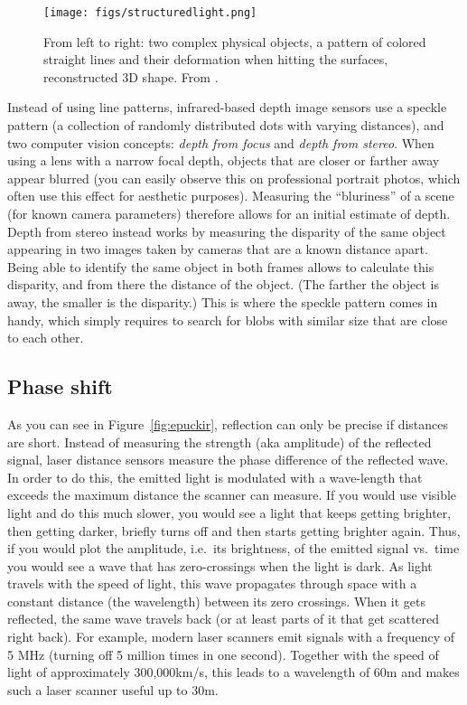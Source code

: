\begin{figure}
	\centering
		\texttt{[image: figs/structuredlight.png]}
	\caption{From left to right: two complex physical objects, a pattern of colored straight lines and their deformation when hitting the surfaces, reconstructed 3D shape. From \protect\cite{zhang2002rapid}.}
	\label{fig:struclight}
\end{figure}

Instead of using line patterns, infrared-based depth image sensors use a speckle pattern (a collection of randomly distributed dots with varying distances), and two computer vision concepts: \emph{depth from focus} and \emph{depth from stereo}. When using a lens with a narrow focal depth, objects that are closer or farther away appear blurred (you can easily observe this on professional portrait photos, which often use this effect for aesthetic purposes). Measuring the ``bluriness'' of a scene (for known camera parameters) therefore allows for an initial estimate of depth. Depth from stereo instead works by measuring the disparity of the same object appearing in two images taken by cameras that are a known distance apart. Being able to identify the same object in both frames allows to calculate this disparity, and from there the distance of the object. (The farther the object is away, the smaller is the disparity.) This is where the speckle pattern comes in handy, which simply requires to search for blobs with similar size that are close to each other.


\subsection{Phase shift}\label{sec:phaseshiftsensors}
As you can see in Figure~\ref{fig:epuckir}, reflection can only be precise if distances are short. Instead of measuring the strength (aka amplitude) of the reflected signal, laser distance sensors measure the phase difference of the reflected wave. In order to do this, the emitted light is modulated with a wave-length that exceeds the maximum distance the scanner can measure. If you would use visible light and do this much slower, you would see a light that keeps getting brighter, then getting darker, briefly turns off and then starts getting brighter again. Thus, if you would plot the amplitude, i.e.\ its brightness, of the emitted signal vs.\ time you would see a wave that has zero-crossings when the light is dark. As light travels with the speed of light, this wave propagates through space with a constant distance (the wavelength) between its zero crossings. When it gets reflected, the same wave travels back (or at least parts of it that get scattered right back). For example, modern laser scanners emit signals with a frequency of 5 MHz (turning off 5 million times in one second). Together with the speed of light of approximately 300,000km/s, this leads to a wavelength of 60m and makes such a laser scanner useful up to 30m.

